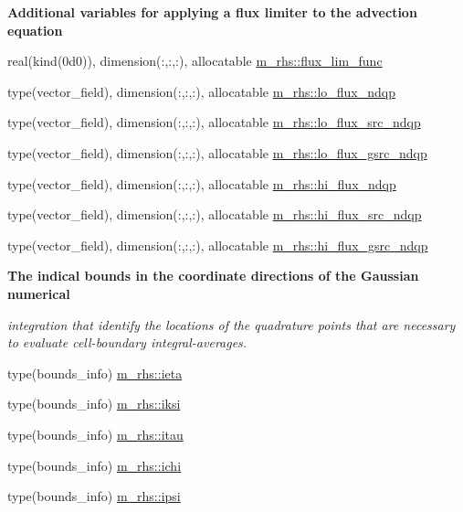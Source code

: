 \begin{Indent}\textbf{ Additional variables for applying a flux limiter to the advection equation}\par
\begin{DoxyCompactItemize}
\item 
real(kind(0d0)), dimension(\+:,\+:,\+:), allocatable \hyperlink{namespacem__rhs_a93dc4910f18014dacfb740debe18356d}{m\+\_\+rhs\+::flux\+\_\+lim\+\_\+func}
\item 
type(vector\+\_\+field), dimension(\+:,\+:,\+:), allocatable \hyperlink{namespacem__rhs_a3b8952eebc8ad3082a6dae29c2ddd480}{m\+\_\+rhs\+::lo\+\_\+flux\+\_\+ndqp}
\item 
type(vector\+\_\+field), dimension(\+:,\+:,\+:), allocatable \hyperlink{namespacem__rhs_abb201391897c33f0eb782f74f88d4ec0}{m\+\_\+rhs\+::lo\+\_\+flux\+\_\+src\+\_\+ndqp}
\item 
type(vector\+\_\+field), dimension(\+:,\+:,\+:), allocatable \hyperlink{namespacem__rhs_af07ecd26e050830ebeedaae6da3eb72a}{m\+\_\+rhs\+::lo\+\_\+flux\+\_\+gsrc\+\_\+ndqp}
\item 
type(vector\+\_\+field), dimension(\+:,\+:,\+:), allocatable \hyperlink{namespacem__rhs_af2fd928afcca77f0351ad57592dc53f4}{m\+\_\+rhs\+::hi\+\_\+flux\+\_\+ndqp}
\item 
type(vector\+\_\+field), dimension(\+:,\+:,\+:), allocatable \hyperlink{namespacem__rhs_a41372eab4f40baf2501e543f406a1cab}{m\+\_\+rhs\+::hi\+\_\+flux\+\_\+src\+\_\+ndqp}
\item 
type(vector\+\_\+field), dimension(\+:,\+:,\+:), allocatable \hyperlink{namespacem__rhs_a95522bf6827d87664b25022fe145eddf}{m\+\_\+rhs\+::hi\+\_\+flux\+\_\+gsrc\+\_\+ndqp}
\end{DoxyCompactItemize}
\end{Indent}
\begin{Indent}\textbf{ The indical bounds in the coordinate directions of the Gaussian numerical}\par
{\em integration that identify the locations of the quadrature points that are necessary to evaluate cell-\/boundary integral-\/averages. }\begin{DoxyCompactItemize}
\item 
type(bounds\+\_\+info) \hyperlink{namespacem__rhs_a806c4c0942bfd830bb0b8b6276258d01}{m\+\_\+rhs\+::ieta}
\item 
type(bounds\+\_\+info) \hyperlink{namespacem__rhs_a6b5d4a4e84fc5b93c1a13151ae398cc6}{m\+\_\+rhs\+::iksi}
\item 
type(bounds\+\_\+info) \hyperlink{namespacem__rhs_afa742a72b96bfdbfa7d4ed2702f9d5f1}{m\+\_\+rhs\+::itau}
\item 
type(bounds\+\_\+info) \hyperlink{namespacem__rhs_ad2b935d288f68dbde65021da0498007d}{m\+\_\+rhs\+::ichi}
\item 
type(bounds\+\_\+info) \hyperlink{namespacem__rhs_ae55731ba38044366ff7ddecf95297657}{m\+\_\+rhs\+::ipsi}
\end{DoxyCompactItemize}
\end{Indent}
